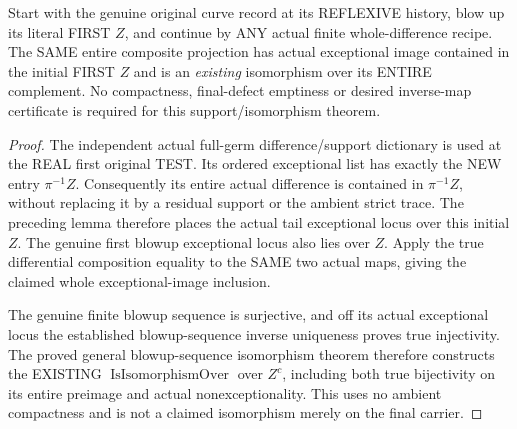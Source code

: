\begin{theorem}
\label{hir:sharp-actual-curve-two-phase-projection-first-defect-complement}
\leanok
Start with the genuine original curve record at its REFLEXIVE history,
blow up its literal FIRST $Z$, and continue by ANY actual finite
whole-difference recipe. The SAME entire composite projection has
actual exceptional image contained in the initial FIRST $Z$ and is an
\emph{existing} isomorphism over its ENTIRE complement. No compactness,
final-defect emptiness or desired inverse-map certificate is required
for this support/isomorphism theorem.
\end{theorem}
\begin{proof}
The independent actual full-germ difference/support dictionary is used
at the REAL first original TEST. Its ordered exceptional list has
exactly the NEW entry $\pi^{-1}Z$. Consequently its entire actual
difference is contained in $\pi^{-1}Z$, without replacing it by a
residual support or the ambient strict trace. The preceding lemma
therefore places the actual tail exceptional locus over this initial
$Z$. The genuine first blowup exceptional locus also lies over $Z$.
Apply the true differential composition equality to the SAME two
actual maps, giving the claimed whole exceptional-image inclusion.

The genuine finite blowup sequence is surjective, and off its actual
exceptional locus the established blowup-sequence inverse uniqueness
proves true injectivity. The proved general blowup-sequence
isomorphism theorem therefore constructs the EXISTING
$\operatorname{IsIsomorphismOver}$ over $Z^c$, including both true
bijectivity on its entire preimage and actual nonexceptionality.
This uses no ambient compactness and is not a claimed isomorphism
merely on the final carrier.
\end{proof}

